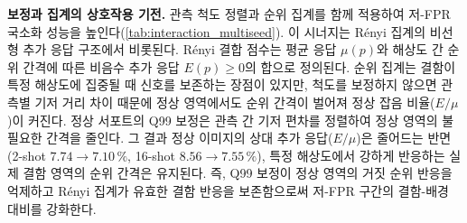 \noindent\textbf{보정과 집계의 상호작용 기전.}
 관측 척도 정렬과 순위 집계를 함께 적용하여 저-FPR 국소화 성능을 높인다(\cref{tab:interaction_multiseed}).
이 시너지는 Rényi 집계의 비선형 추가 응답 구조에서 비롯된다. Rényi 결합 점수는 평균 응답 $\mu(p)$와 해상도 간 순위 간격에 따른 비음수 추가 응답 $E(p) \ge 0$의 합으로 정의된다. 순위 집계는 결함이 특정 해상도에 집중될 때 신호를 보존하는 장점이 있지만, 척도를 보정하지 않으면 관측별 기저 거리 차이 때문에 정상 영역에서도 순위 간격이 벌어져 정상 잡음 비율($E/\mu$)이 커진다.
정상 서포트의 Q99 보정은 관측 간 기저 편차를 정렬하여 정상 영역의 불필요한 간격을 줄인다. 그 결과 정상 이미지의 상대 추가 응답($E/\mu$)은 줄어드는 반면(2-shot $7.74\rightarrow7.10\,\%$, 16-shot $8.56\rightarrow7.55\,\%$), 특정 해상도에서 강하게 반응하는 실제 결함 영역의 순위 간격은 유지된다.
즉, Q99 보정이 정상 영역의 거짓 순위 반응을 억제하고 Rényi 집계가 유효한 결함 반응을 보존함으로써 저-FPR 구간의 결함-배경 대비를 강화한다.


